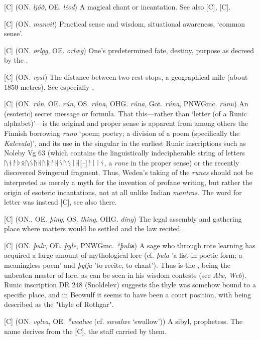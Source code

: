 \begin{itemize}
[C] (ON. \emph{ljóð}, OE. \emph{léod})
  A magical chant or incantation. See also [C], [C].

[C] (ON. \emph{manvit})
  Practical sense and wisdom, situational awareness, ‘common sense’.

[C] (ON. \emph{ørlǫg}, OE. \emph{orlæg})
  One’s predetermined fate, destiny, purpose as decreed by the .

[C] (ON. \emph{rǫst})
  The distance between two rest-stops, a geographical mile (about 1850 metres). See especially \CV.

[C] (ON. \emph{rún}, OE. \emph{rún}, OS. \emph{rúna}, OHG. \emph{rúna}, Got. \emph{rúna}, PNWGmc. \emph{rūnu})
  An (esoteric) secret message or formula. That this—rather than ‘letter (of a Runic alphabet)’—is the original and proper sense is apparent from among others the Finnish borrowing \emph{runo} ‘poem; poetry; a division of a poem (specifically the \emph{Kalevala})’, and its use in the singular in the earliest Runic inscriptions such as Noleby Vg 63 (which contains the linguistically indecipherable string of letters ᚢᚾᚨᚦᛟᚢᛊᚢᚺᚢᚱᚨᚺᛊᚢᛊᛁᚺ[--]ᚨᛁᛁᚾ, a \emph{rune} in the proper sense) or the recently discovered Svingerud fragment. Thus, Weden’s taking of the \emph{runes} should not be interpreted as merely a myth for the invention of profane writing, but rather the origin of esoteric incantations, not at all unlike Indian \emph{mantras}.
  The word for letter was instead [C], see also there.

[C] (ON., OE. \emph{þing}, OS. \emph{thing}, OHG. \emph{ding})
  The legal assembly and gathering place where matters would be settled and the law recited.

[C] (ON. \emph{þulr}, OE. \emph{þyle}, PNWGmc. \emph{*þuliʀ})
  A sage who through rote learning has acquired a large amount of mythological lore (cf. \emph{þula} 'a list in poetic form; a meaningless poem' and \emph{þylja} 'to recite, to chant'). Thus  is the , being the unbeaten master of lore, as can be seen in his wisdom contests (see \emph{Alw}, \emph{Web}). Runic inscription DR 248 (Snoldelev) suggests the thyle was somehow bound to a specific place, and in Beowulf it seems to have been a court position, with  being described as the "thyle of Rothgar".

[C] (ON. \emph{vǫlva}, OE. \emph{*wealwe} (cf. \emph{swealwe} ‘swallow’))
  A sibyl, prophetess. The name derives from the [C], the staff carried by them.


\end{itemize}
